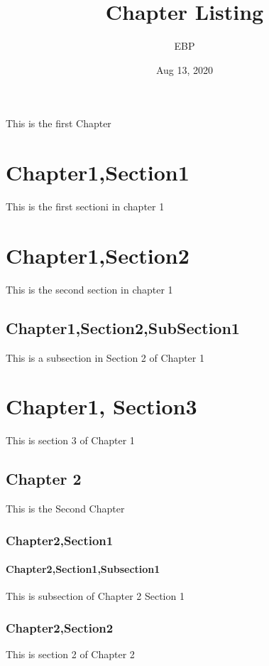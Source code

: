 \documentclass[letterpaper,10pt,english]{sphinxmanual}
\title{Chapter Listing}
\date{Aug 13, 2020}
\author{EBP}
\begin{document}
\pagestyle{empty}
\sphinxmaketitle
\pagestyle{plain}
\sphinxtableofcontents
\pagestyle{normal}
\label{\detokenize{chapter1::doc}}


This is the first Chapter


\chapter{Chapter1,Section1}
\label{\detokenize{chapter1:chapter1-section1}}
This is the first sectioni in chapter 1


\chapter{Chapter1,Section2}
\label{\detokenize{chapter1:chapter1-section2}}
This is the second section in chapter 1


\section{Chapter1,Section2,SubSection1}
\label{\detokenize{chapter1:chapter1-section2-subsection1}}
This is a subsection in Section 2 of Chapter 1


\chapter{Chapter1, Section3}
\label{\detokenize{chapter1:chapter1-section3}}
This is section 3 of Chapter 1


\section{Chapter 2}
\label{\detokenize{chapter2:chapter-2}}\label{\detokenize{chapter2::doc}}
This is the Second Chapter


\subsection{Chapter2,Section1}
\label{\detokenize{chapter2:chapter2-section1}}

\subsubsection{Chapter2,Section1,Subsection1}
\label{\detokenize{chapter2:chapter2-section1-subsection1}}
This is subsection of Chapter 2 Section 1


\subsection{Chapter2,Section2}
\label{\detokenize{chapter2:chapter2-section2}}
This is section 2 of Chapter 2
\end{document}
